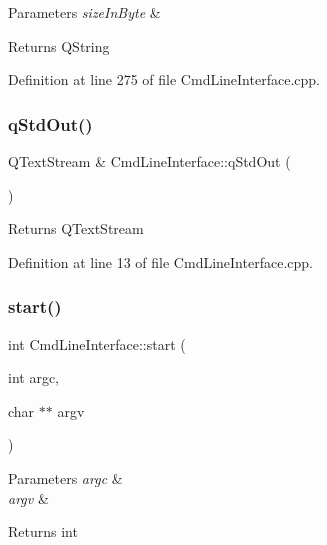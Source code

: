 \begin{DoxyParams}{Parameters}
{\em size\+In\+Byte} & \\
\hline
\end{DoxyParams}
\begin{DoxyReturn}{Returns}
Q\+String 
\end{DoxyReturn}


Definition at line 275 of file Cmd\+Line\+Interface.\+cpp.

\mbox{\label{class_cmd_line_interface_a35b2da2241002c6cd37937e01ee1e649}} 
\subsubsection{\texorpdfstring{q\+Std\+Out()}{qStdOut()}}
{\footnotesize\ttfamily Q\+Text\+Stream \& Cmd\+Line\+Interface\+::q\+Std\+Out (\begin{DoxyParamCaption}{ }\end{DoxyParamCaption})\hspace{0.3cm}{\ttfamily [static]}}

\begin{DoxyReturn}{Returns}
Q\+Text\+Stream 
\end{DoxyReturn}


Definition at line 13 of file Cmd\+Line\+Interface.\+cpp.

\mbox{\label{class_cmd_line_interface_af3b0b06d68e78c862e352b7f450c891e}} 
\subsubsection{\texorpdfstring{start()}{start()}}
{\footnotesize\ttfamily int Cmd\+Line\+Interface\+::start (\begin{DoxyParamCaption}\item[{int}]{argc,  }\item[{char $\ast$$\ast$}]{argv }\end{DoxyParamCaption})\hspace{0.3cm}{\ttfamily [virtual]}}


\begin{DoxyParams}{Parameters}
{\em argc} & \\
\hline
{\em argv} & \\
\hline
\end{DoxyParams}
\begin{DoxyReturn}{Returns}
int 
\end{DoxyReturn}


